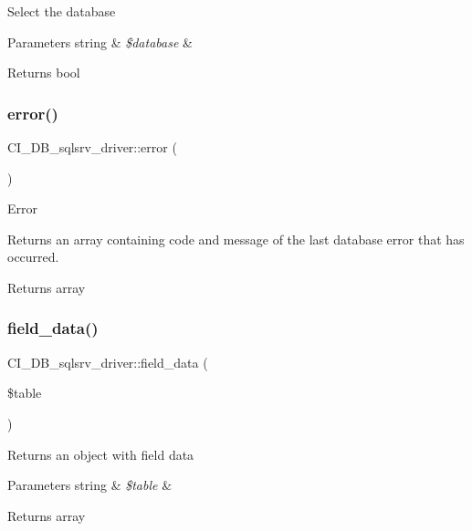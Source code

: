 Select the database


\begin{DoxyParams}[1]{Parameters}
string & {\em \$database} & \\
\hline
\end{DoxyParams}
\begin{DoxyReturn}{Returns}
bool 
\end{DoxyReturn}
\mbox{\label{class_c_i___d_b__sqlsrv__driver_a981b4ae93f2c9f7ae5c3b046ddcba896}} 
\subsubsection{\texorpdfstring{error()}{error()}}
{\footnotesize\ttfamily C\+I\+\_\+\+D\+B\+\_\+sqlsrv\+\_\+driver\+::error (\begin{DoxyParamCaption}{ }\end{DoxyParamCaption})}

Error

Returns an array containing code and message of the last database error that has occurred.

\begin{DoxyReturn}{Returns}
array 
\end{DoxyReturn}
\mbox{\label{class_c_i___d_b__sqlsrv__driver_acc9cddf0e7df4e4c5af95eab2359e5ba}} 
\subsubsection{\texorpdfstring{field\+\_\+data()}{field\_data()}}
{\footnotesize\ttfamily C\+I\+\_\+\+D\+B\+\_\+sqlsrv\+\_\+driver\+::field\+\_\+data (\begin{DoxyParamCaption}\item[{}]{\$table }\end{DoxyParamCaption})}

Returns an object with field data


\begin{DoxyParams}[1]{Parameters}
string & {\em \$table} & \\
\hline
\end{DoxyParams}
\begin{DoxyReturn}{Returns}
array 
\end{DoxyReturn}
\mbox{\label{class_c_i___d_b__sqlsrv__driver_acee44b8c5d564b731cb63ffff236d73f}} 
